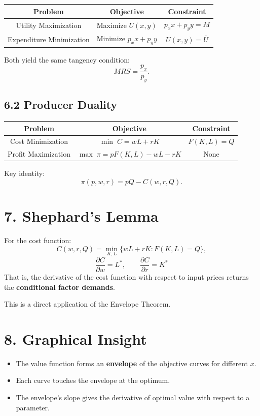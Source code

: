 \documentclass[12pt]{article}
\begin{document}
\begin{center}
\begin{tabular}{c|c|c}
\textbf{Problem} & \textbf{Objective} & \textbf{Constraint} \\ \hline
Utility Maximization & Maximize $U(x,y)$ & $p_x x + p_y y = M$ \\
Expenditure Minimization & Minimize $p_x x + p_y y$ & $U(x,y)=\bar{U}$
\end{tabular}
\end{center}

Both yield the same tangency condition:
\[
MRS=\frac{p_x}{p_y}.
\]

\subsection*{6.2 Producer Duality}
\begin{center}
\begin{tabular}{c|c|c}
\textbf{Problem} & \textbf{Objective} & \textbf{Constraint} \\ \hline
Cost Minimization & $\min\;C=wL+rK$ & $F(K,L)=Q$ \\
Profit Maximization & $\max\;\pi=pF(K,L)-wL-rK$ & None
\end{tabular}
\end{center}

Key identity:
\[
\pi(p,w,r)=pQ-C(w,r,Q).
\]

\section*{7. Shephard’s Lemma}

For the cost function:
\[
C(w,r,Q)=\min_{K,L}\{wL+rK: F(K,L)=Q\},
\]
\[
\boxed{
\frac{\partial C}{\partial w}=L^*, \qquad 
\frac{\partial C}{\partial r}=K^*
}
\]
That is, the derivative of the cost function with respect to input prices returns the \textbf{conditional factor demands}.

This is a direct application of the Envelope Theorem.

\section*{8. Graphical Insight}

\begin{itemize}
\item The value function forms an \textbf{envelope} of the objective curves for different $x$.
\item Each curve touches the envelope at the optimum.
\item The envelope's slope gives the derivative of optimal value with respect to a parameter.
\end{itemize}
\end{document}
